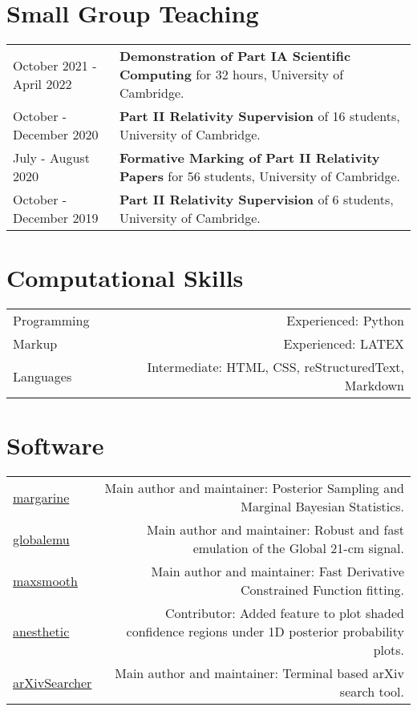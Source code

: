 \documentclass{article}
\begin{document}
\section*{Small Group Teaching}

\begin{tabular}{>{\raggedleft}p{}!{\vrule}p{0.76\textwidth}}
	October 2021 - April 2022 & \textbf{Demonstration of Part IA Scientific Computing} for 32 hours, University of Cambridge.\\
	October - December 2020 & \textbf{Part II Relativity Supervision} of 16 students,  University of Cambridge. \\
	July - August 2020 & \textbf{Formative Marking of Part II Relativity Papers} for 56 students, University of Cambridge. \\
	October - December 2019 & \textbf{Part II Relativity Supervision} of 6 students, University of Cambridge.
\end{tabular}

\section*{Computational Skills}

\begin{tabular}{L!{\vrule}R}
	Programming & Experienced: Python \\
	Markup & Experienced: LATEX \\
	Languages & Intermediate: HTML, CSS, reStructuredText, Markdown
\end{tabular}

\section*{Software}

\begin{tabular}{L!{\vrule}R}
	\href{https://github.com/htjb/margarine}{margarine} & Main author and maintainer: Posterior Sampling and Marginal Bayesian Statistics. \\
	\href{https://github.com/htjb/globalemu}{globalemu} & Main author and maintainer: Robust and fast emulation of the Global 21-cm signal.\\
	\href{https://github.com/htjb/maxsmooth}{maxsmooth} & Main author and maintainer: Fast Derivative Constrained Function fitting.\\
	\href{https://github.com/williamjameshandley/anesthetic}{anesthetic} & Contributor: Added feature to plot shaded confidence regions under 1D posterior probability plots.\\
	\href{https://github.com/htjb/arXivSearcher}{arXivSearcher} & Main author and maintainer: Terminal based arXiv search tool.
\end{tabular}
\end{document}
